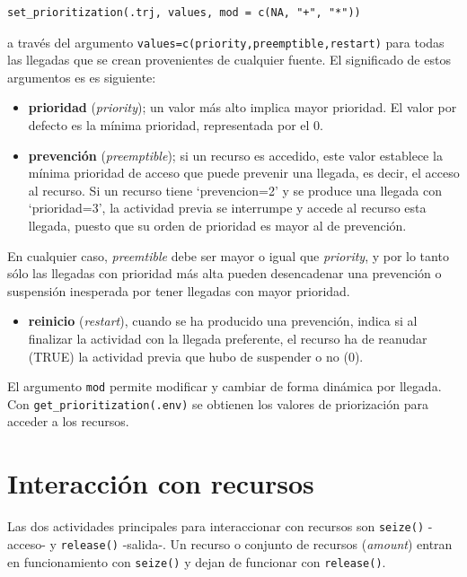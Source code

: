 \documentclass[
]{book}
\providecommand{\tightlist}{%
  \setlength{\itemsep}{0pt}\setlength{\parskip}{0pt}}
\theoremstyle{definition}
\theoremstyle{definition}
\theoremstyle{definition}
\theoremstyle{definition}
\theoremstyle{remark}
\begin{document}
\begin{verbatim}
set_prioritization(.trj, values, mod = c(NA, "+", "*"))
\end{verbatim}

a través del argumento \texttt{values=c(priority,preemptible,restart)} para todas las llegadas que se crean provenientes de cualquier fuente. El significado de estos argumentos es es siguiente:

\begin{itemize}
\tightlist
\item
  \textbf{prioridad} (\emph{priority}); un valor más alto implica mayor prioridad. El valor por defecto es la mínima prioridad, representada por el 0.
\item
  \textbf{prevención} (\emph{preemptible}); si un recurso es accedido, este valor establece la mínima prioridad de acceso que puede prevenir una llegada, es decir, el acceso al recurso. Si un recurso tiene `prevencion=2' y se produce una llegada con `prioridad=3', la actividad previa se interrumpe y accede al recurso esta llegada, puesto que su orden de prioridad es mayor al de prevención.
\end{itemize}

En cualquier caso, \emph{preemtible} debe ser mayor o igual que \emph{priority}, y por lo tanto sólo las llegadas con prioridad más alta pueden desencadenar una prevención o suspensión inesperada por tener llegadas con mayor prioridad.

\begin{itemize}
\tightlist
\item
  \textbf{reinicio} (\emph{restart}), cuando se ha producido una prevención, indica si al finalizar la actividad con la llegada preferente, el recurso ha de reanudar (TRUE) la actividad previa que hubo de suspender o no (0).
\end{itemize}

El argumento \texttt{mod} permite modificar y cambiar de forma dinámica por llegada. Con \texttt{get\_prioritization(.env)} se obtienen los valores de priorización para acceder a los recursos.

\hypertarget{interacciuxf3n-con-recursos}{%
\section{Interacción con recursos}\label{interacciuxf3n-con-recursos}}

Las dos actividades principales para interaccionar con recursos son \texttt{seize()} -acceso- y \texttt{release()} -salida-. Un recurso o conjunto de recursos (\emph{amount}) entran en funcionamiento con \texttt{seize()} y dejan de funcionar con \texttt{release()}.
\end{document}
